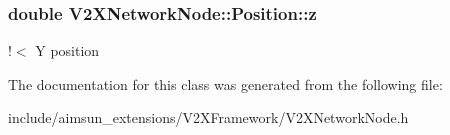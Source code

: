 \subsubsection[{\texorpdfstring{z}{z}}]{\setlength{\rightskip}{0pt plus 5cm}double V2\+X\+Network\+Node\+::\+Position\+::z}\hypertarget{classV2XNetworkNode_1_1Position_a62ad74894b82d59081584aab1b5598a2}{}\label{classV2XNetworkNode_1_1Position_a62ad74894b82d59081584aab1b5598a2}
!$<$ Y position 

The documentation for this class was generated from the following file\+:\begin{DoxyCompactItemize}
\item 
include/aimsun\+\_\+extensions/\+V2\+X\+Framework/V2\+X\+Network\+Node.\+h\end{DoxyCompactItemize}
